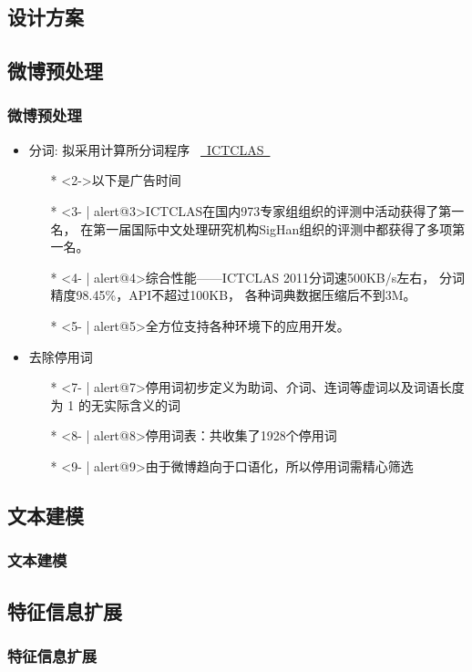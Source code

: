\documentclass[CJKutf8, table]{beamer}
\begin{document}
\begin{CJK}{UTF8}{gbsn}
\section{设计方案}
\subsection{微博预处理}
\begin{frame}
  \frametitle{微博预处理}
  \begin{itemize}
    \item<1- | alert@1>{分词: 拟采用计算所分词程序
      ~\href{http://ictclas.org/}{~ICTCLAS~}}
      \begin{itemize}
        \item[*]<2->{以下是广告时间\smiley}
        \item[*]<3- | alert@3>{ICTCLAS在国内973专家组组织的评测中活动获得了第一名，
          在第一届国际中文处理研究机构SigHan组织的评测中都获得了多项第一名。}
        \item[*]<4- | alert@4>{综合性能——ICTCLAS 2011分词速500KB/s左右，
          分词精度98.45\%，API不超过100KB，
          各种词典数据压缩后不到3M。}
        \item[*]<5- | alert@5>{全方位支持各种环境下的应用开发。}
      \end{itemize}
    \item<6- | alert@6>{去除停用词}
      \begin{itemize}
        \item[*]<7- | alert@7>{停用词初步定义为助词、介词、连词等虚词以及词语长度为
          1 的无实际含义的词}
        \item[*]<8- | alert@8>{停用词表：共收集了1928个停用词}
        \item[*]<9- | alert@9>{由于微博趋向于口语化，所以停用词需精心筛选}
      \end{itemize}
  \end{itemize}
\end{frame}

\subsection{文本建模}
\begin{frame}
  \frametitle{文本建模}
\end{frame}

\subsection{特征信息扩展}
\begin{frame}
  \frametitle{特征信息扩展}
\end{frame}


\end{CJK}
\end{document}
